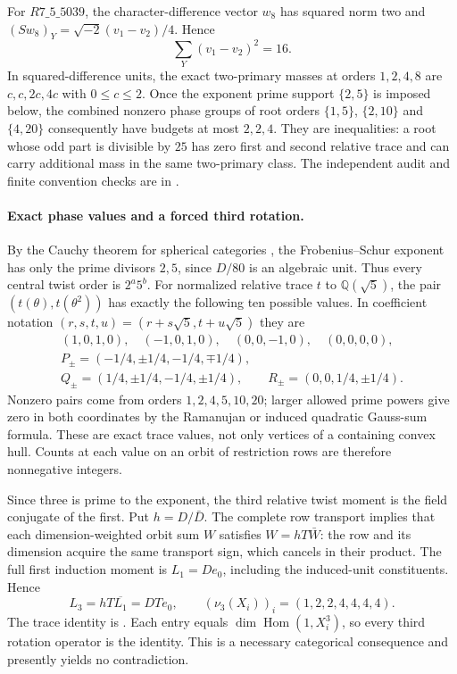 For $R7\_5\_5039$, the character-difference vector $w_8$ has squared
norm two and
$(Sw_8)_Y=\sqrt{-2}(v_1-v_2)/4$.  Hence
\[
 \sum_Y(v_1-v_2)^2=16.
\]
In squared-difference units, the exact two-primary masses at orders
$1,2,4,8$ are $c,c,2c,4c$ with $0\leq c\leq2$.  Once the exponent prime support
$\{2,5\}$ is imposed below, the combined nonzero phase groups of
root orders $\{1,5\}$, $\{2,10\}$ and $\{4,20\}$ consequently
have budgets at most $2,2,4$.  They are inequalities: a root whose
odd part is divisible by $25$ has zero first and second relative
trace and can carry additional mass in the same two-primary class.
The independent audit and finite convention checks are in
.

\paragraph{Exact phase values and a forced third rotation.}
By the Cauchy theorem for spherical categories
\cite[Theorem~3.9]{BNRW}, the Frobenius--Schur exponent has only the
prime divisors $2,5$, since $D/80$ is an algebraic unit.  Thus every
central twist order is $2^a5^b$.  For normalized relative trace $t$ to
$\mathbb Q(\sqrt5)$, the pair $(t(\theta),t(\theta^2))$ has exactly
the following ten possible values.  In coefficient notation
$(r,s,t,u)=(r+s\sqrt5,t+u\sqrt5)$ they are
\begin{gather*}
 (1,0,1,0),\quad(-1,0,1,0),\quad(0,0,-1,0),\quad(0,0,0,0),\\
 P_\pm=(-1/4,\pm1/4,-1/4,\mp1/4),\\
 Q_\pm=(1/4,\pm1/4,-1/4,\pm1/4),\qquad
 R_\pm=(0,0,1/4,\pm1/4).
\end{gather*}
Nonzero pairs come from orders $1,2,4,5,10,20$; larger allowed
prime powers give zero in both coordinates by the Ramanujan or induced
quadratic Gauss-sum formula.  These are exact trace values, not only
vertices of a containing convex hull.  Counts at each value on an
orbit of restriction rows are therefore nonnegative integers.

Since three is prime to the exponent, the third relative twist moment
is the field conjugate of the first.  Put $h=D/\bar D$.  The complete
row transport implies that each dimension-weighted orbit sum $W$
satisfies $W=hT\bar W$: the row and its dimension acquire the same
transport sign, which cancels in their product.  The full first induction moment is
$L_1=De_0$, including the induced-unit constituents.  Hence
\[
 L_3=hT\overline{L_1}=DTe_0,
 \qquad (\nu_3(X_i))_i=(1,2,2,4,4,4,4).
\]
The trace identity is \cite[Theorem~4.1]{NgSchauenburgExponent}.
Each entry equals $\dim\operatorname{Hom}(1,X_i^3)$, so every third
rotation operator is the identity.  This is a necessary categorical
consequence and presently yields no contradiction.

